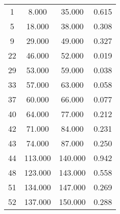 % 
\begin{tabular}{cccc}
  \hline
  \hline
1 & 8.000 & 35.000 & 0.615 \\ 
  5 & 18.000 & 38.000 & 0.308 \\ 
  9 & 29.000 & 49.000 & 0.327 \\ 
  22 & 46.000 & 52.000 & 0.019 \\ 
  29 & 53.000 & 59.000 & 0.038 \\ 
  33 & 57.000 & 63.000 & 0.058 \\ 
  37 & 60.000 & 66.000 & 0.077 \\ 
  40 & 64.000 & 77.000 & 0.212 \\ 
  42 & 71.000 & 84.000 & 0.231 \\ 
  43 & 74.000 & 87.000 & 0.250 \\ 
  44 & 113.000 & 140.000 & 0.942 \\ 
  48 & 123.000 & 143.000 & 0.558 \\ 
  51 & 134.000 & 147.000 & 0.269 \\ 
  52 & 137.000 & 150.000 & 0.288 \\ 
   \hline
\end{tabular}
